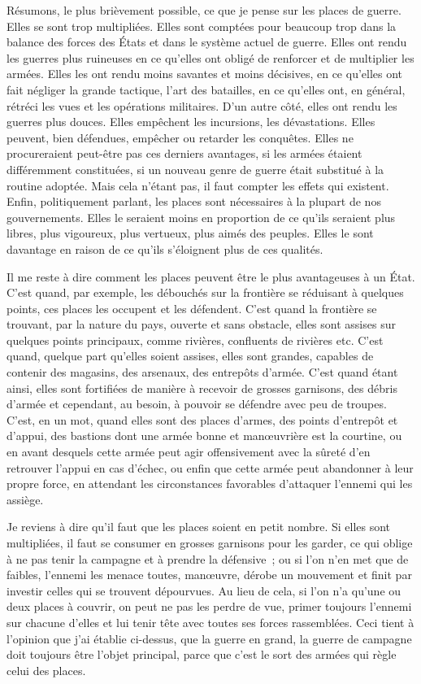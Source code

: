 \documentclass[french,twoside]{book} %
\begin{document}
Résumons, le plus brièvement possible, ce que je pense sur les places de guerre. Elles se sont trop multipliées. Elles sont comptées pour beaucoup trop dans la balance des forces des États et dans le système actuel de guerre. Elles ont rendu les guerres plus ruineuses en ce qu’elles ont obligé de renforcer et de multiplier les armées. Elles les ont rendu moins savantes et moins décisives, en ce qu’elles ont fait négliger la grande tactique, l’art des batailles, en ce qu’elles ont, en général, rétréci les vues et les opérations militaires. D’un autre côté, elles ont rendu les guerres plus douces. Elles empêchent les incursions, les dévastations. Elles peuvent, bien défendues, empêcher ou retarder les conquêtes. Elles ne procureraient peut-être pas ces derniers avantages, si les armées étaient différemment constituées, si un nouveau genre de guerre était substitué à la routine adoptée. Mais cela n’étant pas, il faut compter les effets qui existent. Enfin, politiquement parlant, les places sont nécessaires à la plupart de nos gouvernements. Elles le seraient moins en proportion de ce qu’ils seraient plus libres, plus vigoureux, plus vertueux, plus aimés des peuples. Elles le sont davantage en raison de ce qu’ils s’éloignent plus de ces qualités.\par
Il me reste à dire comment les places peuvent être le plus avantageuses à un État. C’est quand, par exemple, les débouchés sur la frontière se réduisant à quelques points, ces places les occupent et les défendent. C’est quand la frontière se trouvant, par la nature du pays, ouverte et sans obstacle, elles sont assises sur quelques points principaux, comme rivières, confluents de rivières etc. C’est quand, quelque part qu’elles soient assises, elles sont grandes, capables de contenir des magasins, des arsenaux, des entrepôts d’armée. C’est quand étant ainsi, elles sont fortifiées de manière à recevoir de grosses garnisons, des débris d’armée et cependant, au besoin, à pouvoir se défendre avec peu de troupes. C’est, en un mot, quand elles sont des places d’armes, des points d’entrepôt et d’appui, des bastions dont une armée bonne et manœuvrière est la courtine, ou en avant desquels cette armée peut agir offensivement avec la sûreté d’en retrouver l’appui en cas d’échec, ou enfin que cette armée peut abandonner à leur propre force, en attendant les circonstances favorables d’attaquer l’ennemi qui les assiège.\par
Je reviens à dire qu’il faut que les places soient en petit nombre. Si elles sont multipliées, il faut se consumer en grosses garnisons pour les garder, ce qui oblige à ne pas tenir la campagne et à prendre la défensive ; ou si l’on n’en met que de faibles, l’ennemi les menace toutes, manœuvre, dérobe un mouvement et finit par investir celles qui se trouvent dépourvues. Au lieu de cela, si l’on n’a qu’une ou deux places à couvrir, on peut ne pas les perdre de vue, primer toujours l’ennemi sur chacune d’elles et lui tenir tête avec toutes ses forces rassemblées. Ceci tient à l’opinion que j’ai établie ci-dessus, que la guerre en grand, la guerre de campagne doit toujours être l’objet principal, parce que c’est le sort des armées qui règle celui des places.\par
\end{document}
